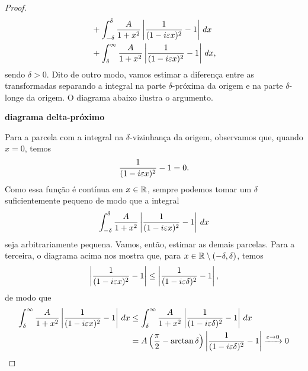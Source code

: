 \begin{proof}
\begin{align*}
                &+ \int_{-\delta}^{\delta} \frac{A}{1+ x^2}\left| \frac{1}{(1-i\varepsilon x)^2} - 1 \right| \, dx \\
                &+ \int_{\delta}^{\infty} \frac{A}{1+ x^2}\left| \frac{1}{(1-i\varepsilon x)^2} - 1 \right| \, dx,
            \end{align*}
            sendo $\delta > 0$. Dito de outro modo, vamos estimar a diferença entre as transformadas
            separando a integral na parte $\delta$-próxima da origem e na parte $\delta$-longe da origem.
            O diagrama abaixo ilustra o argumento.
            \begin{center}
                {\bf diagrama delta-próximo}
            \end{center}
            Para a parcela com a integral na $\delta$-vizinhança da origem, observamos que, quando $x = 0$,
            temos
            \begin{equation*}
                \frac{1}{(1-i\varepsilon x)^2} - 1 = 0.
            \end{equation*}
            Como essa função é contínua em $x\in\mathbb{R}$, sempre podemos tomar um $\delta$ suficientemente pequeno
            de modo que a integral
            \begin{equation*}
                \int_{-\delta}^{\delta} \frac{A}{1+ x^2}\left| \frac{1}{(1-i\varepsilon x)^2} - 1 \right| \, dx
            \end{equation*}
            seja arbitrariamente pequena. Vamos, então, estimar as demais parcelas. Para a terceira, o diagrama
            acima nos mostra que, para $x\in\mathbb{R}\setminus (-\delta, \delta)$, temos
            \begin{align*}
                \left| \frac{1}{(1-i\varepsilon x)^2} - 1 \right| \leq \left| \frac{1}{(1-i\varepsilon\delta)^2} - 1 \right|,
            \end{align*}
            de modo que
            \begin{align*}
                \int_{\delta}^{\infty} \frac{A}{1+ x^2}\left| \frac{1}{(1-i\varepsilon x)^2} - 1 \right| \, dx
                &\leq \int_{\delta}^{\infty} \frac{A}{1+ x^2}\left| \frac{1}{(1-i\varepsilon\delta)^2} - 1 \right| \, dx \\
                &=  A\left( \frac{\pi}{2} - \arctan\delta \right) \left| \frac{1}{(1-i\varepsilon\delta)^2} - 1 \right| 
                \xrightarrow{\varepsilon\to 0} 0
            \end{align*}

\end{proof}

